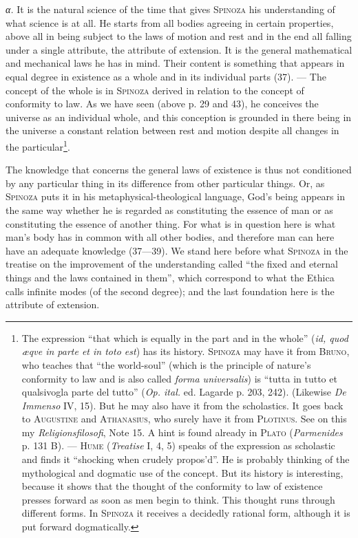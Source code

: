 \documentclass[12pt]{article}
\begin{document}
\textit{α.} It is the natural science of the time that gives \textsc{Spinoza} his
understanding of what science is at all. He starts from all bodies agreeing in certain
properties, above all in being subject to the laws of motion and rest and in the end all
falling under a single attribute, the attribute of extension. It is the general mathematical
and mechanical laws he has in mind. Their content is something that appears in equal degree
in existence as a whole and in its individual parts (37). --- The concept of the whole is in
\textsc{Spinoza} derived in relation to the concept of conformity to law. As we have seen
(above p. 29 and 43), he conceives the universe as an individual whole, and this conception
is grounded in there being in the universe a constant relation between rest and motion
despite all changes in the particular\footnote{The expression ``that which is equally in the
part and in the whole'' (\textit{id, quod æqve in parte et in toto est}) has its history.
\textsc{Spinoza} may have it from \textsc{Bruno}, who teaches that ``the world-soul'' (which
is the principle of nature's conformity to law and is also called \textit{forma
universalis}) is ``tutta in tutto et qualsivogla parte del tutto'' (\textit{Op. ital.} ed.
Lagarde p. 203, 242). (Likewise \textit{De Immenso} IV, 15). But he may also have it from the
scholastics. It goes back to \textsc{Augustine} and \textsc{Athanasius}, who surely have it
from \textsc{Plotinus}. See on this my \textit{Religionsfilosofi}, Note 15. A hint is found
already in \textsc{Plato} (\textit{Parmenides} p. 131 B). --- \textsc{Hume}
(\textit{Treatise} I, 4, 5) speaks of the expression as scholastic and finds it ``shocking
when crudely propos'd''. He is probably thinking of the mythological and dogmatic use of the
concept. But its history is interesting, because it shows that the thought of the conformity
to law of existence presses forward as soon as men begin to think. This thought runs through
different forms. In \textsc{Spinoza} it receives a decidedly rational form, although it is
put forward dogmatically.}.

The knowledge that concerns the general laws of existence is thus not conditioned by any
particular thing in its difference from other particular things. Or, as \textsc{Spinoza}
puts it in his metaphysical-theological language, God's being appears in the same way
whether he is regarded as constituting the essence of man or as constituting the essence of
another thing. %
For what is in question here is what man's body has in common with all other bodies, and
therefore man can here have an adequate knowledge (37---39). We stand here before what
\textsc{Spinoza} in the treatise on the improvement of the understanding called ``the fixed
and eternal things and the laws contained in them'', which correspond to what the Ethica
calls infinite modes (of the second degree); and the last foundation here is the attribute
of extension.
\end{document}
